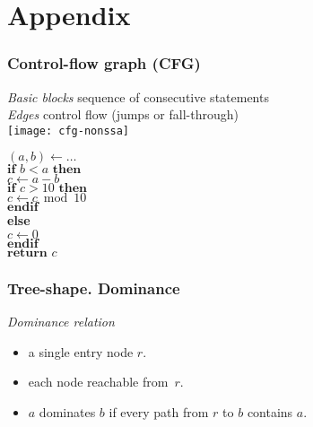 \section*{Appendix}
\begin{frame}[noframenumbering,label=CFG]
\frametitle{Control-flow graph (CFG)}
%
\emph{Basic blocks} sequence of consecutive statements\\
\emph{Edges} control flow (jumps or fall-through)\\
\vskip5mm
\hfill
\texttt{[image: cfg-nonssa]}\hfill
\begin{minipage}[t]{0.25\textwidth}
\footnotesize
\textperiodcentered$(a,b)\gets \ldots$\\
\textperiodcentered$\textbf{if } b<a\textbf{ then}$\\
\textperiodcentered\hspace{1em}$c\gets a-b$\\
\textperiodcentered\hspace{1em}$\textbf{if } c>10\textbf{ then}$\\
\textperiodcentered\hspace{2em}$c \gets c \bmod 10$\\
\textperiodcentered\hspace{1em}$\textbf{endif}$\\
\textperiodcentered\textbf{else}\\
\textperiodcentered\hspace{1em}$c\gets 0$\\
\textperiodcentered$\textbf{endif}$\\
\textperiodcentered$\textbf{return } c$
\bigskip
\end{minipage}\hfill\strut
\vfill\hfill\hyperlink{inf-semantics<2>}{}\vskip1cm
\end{frame}

\begin{frame}[noframenumbering,label=DomTree]
\frametitle{Tree-shape. Dominance}

\begin{minipage}{0.48\textwidth}
    \emph{Dominance relation}
    \begin{itemize}
    \item a single entry node $r$.
    \item each node reachable from~$r$.
    \item $a$ dominates $b$ if every path from $r$ to $b$ contains $a$.
    \end{itemize}
    
\end{minipage}
\hfill
\begin{minipage}{0.5\textwidth}
%
%
%
\end{minipage}
\end{frame}

